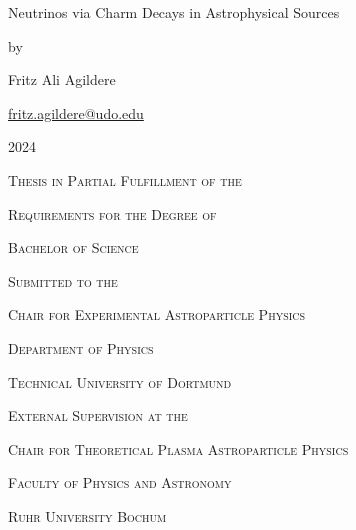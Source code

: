 \begin{titlepage}
		\centering
		\null
		\vspace{5\baselineskip}
		{\Huge{Neutrinos via Charm Decays in Astrophysical Sources}\par}
		\vspace{2\baselineskip}
		by\par
		{\Large{Fritz Ali Agildere}\par}
		\href{mailto:fritz.agildere@udo.edu}{fritz.agildere@udo.edu}\par
		{\large{2024}}\par
		\vspace{4\baselineskip}
		{\textsc{Thesis in Partial Fulfillment of the}}\par
		{\textsc{Requirements for the Degree of}}\par
		{\textsc{Bachelor of Science}}\par
		\vspace{2\baselineskip}
		{\textsc{Submitted to the}}\par
		{\textsc{Chair for Experimental Astroparticle Physics}}\par
		{\textsc{Department of Physics}}\par
		{\textsc{Technical University of Dortmund}}\par
		\vspace{2\baselineskip}
		{\textsc{External Supervision at the}}\par
		{\textsc{Chair for Theoretical Plasma Astroparticle Physics}}\par
		{\textsc{Faculty of Physics and Astronomy}}\par
		{\textsc{Ruhr University Bochum}}
\end{titlepage}
